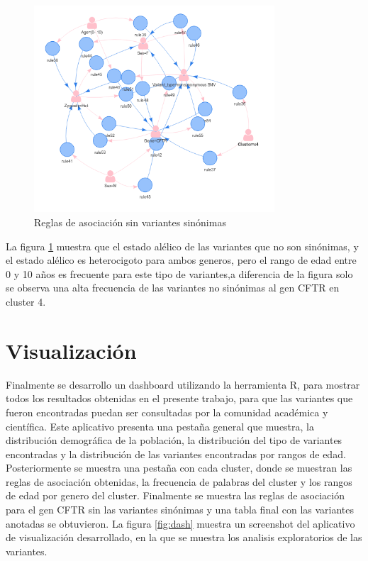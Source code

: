 \begin{figure}[H]
	\centering
	\includegraphics[width=0.8\textwidth]{Kap4/CFTR2}
	\caption{Reglas de asociación sin variantes sinónimas} \label{fig:re6}
\end{figure}

La figura \ref{fig:re6} muestra que el estado alélico de las variantes que no son sinónimas, y el estado alélico es heterocigoto para ambos generos, pero el rango de edad entre 0 y 10 años es frecuente para este tipo de variantes,a diferencia de la figura \label{fig:r6} solo se observa una alta frecuencia de las variantes no sinónimas al gen CFTR en cluster 4.  

\section{Visualización}

Finalmente se desarrollo un dashboard utilizando la herramienta R, para mostrar todos los resultados obtenidas en el presente trabajo, para que las variantes que fueron encontradas puedan ser consultadas por la comunidad académica y científica. Este aplicativo presenta una pestaña general que muestra, la distribución demográfica de la población, la distribución del tipo de variantes encontradas y la distribución de las variantes encontradas por rangos de edad. Posteriormente se muestra una pestaña con cada cluster, donde se muestran las reglas de asociación obtenidas, la frecuencia de palabras del cluster y los rangos de edad por genero del cluster. Finalmente se muestra las reglas de asociación para el gen CFTR sin las variantes sinónimas y una tabla final con las variantes anotadas se obtuvieron. La figura \ref{fig:dash} muestra un screenshot  del aplicativo de visualización desarrollado, en la que se muestra los analisis exploratorios de las variantes.

